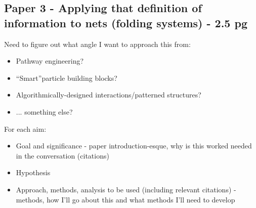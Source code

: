 \subsection{Paper 3 - Applying that definition of information to nets (folding systems) - 2.5 pg}

Need to figure out what angle I want to approach this from:
\begin{itemize}
\item Pathway engineering?
\item``Smart''particle building blocks?
\item Algorithmically-designed interactions/patterned structures?
\item ... something else?
\end{itemize}


For each aim:
\begin{itemize}
\item Goal and significance - paper introduction-esque, why is this worked needed in the conversation (citations)
\item Hypothesis
\item Approach, methods, analysis to be used (including relevant citations) - methods, how I'll go about this and what methods I'll need to develop
\end{itemize}